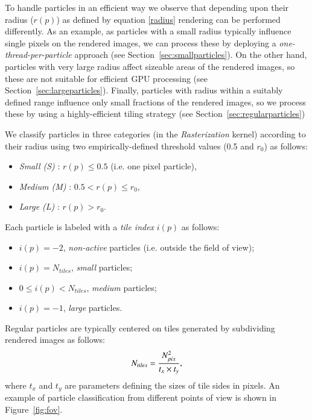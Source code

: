 \documentclass[1p]{elsarticle}
\begin{document}
To handle particles in an efficient way we observe that depending upon their radius ($r(p)$) as defined by equation \eqref{radius} rendering can be performed differently. As an example, as particles with a small radius typically influence single pixels on the rendered images, we can process these by deploying a {\it one-thread-per-particle} approach (see Section~\ref{sec:smallparticles}). On the other hand, particles with very large radius affect sizeable areas of the rendered images, so these are not suitable for efficient GPU processing (see Section~\ref{sec:largeparticles}). Finally, particles with radius within a suitably defined range influence only small fractions of the rendered images, so we process these by using a highly-efficient tiling strategy (see Section~\ref{sec:regularparticles})

We classify particles in three categories (in the {\it Rasterization} kernel) according to their radius  using two empirically-defined threshold values (0.5 and $r_0$) as follows:

\begin{itemize}
\item
{\it Small (S)} : $r(p) \le 0.5$ (i.e. one pixel particle),
\item
{\it Medium (M)} : $0.5 < r(p) \le r_0$,
\item
{\it Large (L)} : $r(p) > r_0$.
\end{itemize}
Each particle is labeled with a {\it tile index} $i(p)$ as follows:
\begin{itemize}
\item
$i(p) = -2$, {\it non-active} particles (i.e. outside the field of view);
\item
$i(p) = N_{tiles}$, {\it small} particles;
\item
$0 \le i(p) < N_{tiles}$, {\it medium} particles;  
\item
$i(p) = -1$, {\it large} particles.
\end{itemize}

Regular particles are typically centered on tiles generated by subdividing rendered images as follows:
\begin{equation}
N_{tiles} = {N_{pix}^2\over t_x \times t_y},  
\end{equation}
where $t_x$ and $t_y$ are parameters defining the sizes of tile sides in pixels. 
An example of particle classification from different points of view is shown in Figure~\ref{fig:fov}.
\end{document}
